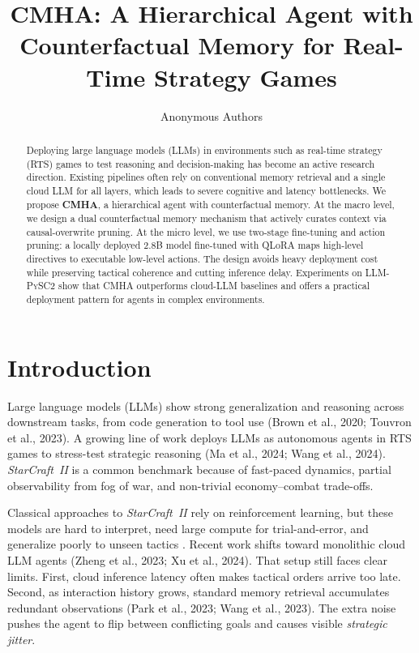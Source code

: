 \documentclass[11pt,a4paper]{article}
\title{CMHA: A Hierarchical Agent with Counterfactual Memory for Real-Time Strategy Games}
\author{Anonymous Authors}
\begin{document}
\maketitle

\begin{abstract}
Deploying large language models (LLMs) in environments such as real-time strategy (RTS) games to test reasoning and decision-making has become an active research direction. Existing pipelines often rely on conventional memory retrieval and a single cloud LLM for all layers, which leads to severe cognitive and latency bottlenecks. We propose \textbf{CMHA}, a hierarchical agent with counterfactual memory. At the macro level, we design a dual counterfactual memory mechanism that actively curates context via causal-overwrite pruning. At the micro level, we use two-stage fine-tuning and action pruning: a locally deployed 2.8B model fine-tuned with QLoRA maps high-level directives to executable low-level actions. The design avoids heavy deployment cost while preserving tactical coherence and cutting inference delay. Experiments on \textsc{LLM-PySC2} show that CMHA outperforms cloud-LLM baselines and offers a practical deployment pattern for agents in complex environments.
\end{abstract}

\section{Introduction}

Large language models (LLMs) show strong generalization and reasoning across downstream tasks, from code generation to tool use (Brown et al., 2020; Touvron et al., 2023). A growing line of work deploys LLMs as autonomous agents in RTS games to stress-test strategic reasoning (Ma et al., 2024; Wang et al., 2024). \textit{StarCraft~II} is a common benchmark because of fast-paced dynamics, partial observability from fog of war, and non-trivial economy--combat trade-offs.

Classical approaches to \textit{StarCraft~II} rely on reinforcement learning, but these models are hard to interpret, need large compute for trial-and-error, and generalize poorly to unseen tactics \citep{vinyals2019}. Recent work shifts toward monolithic cloud LLM agents (Zheng et al., 2023; Xu et al., 2024). That setup still faces clear limits. First, cloud inference latency often makes tactical orders arrive too late. Second, as interaction history grows, standard memory retrieval accumulates redundant observations (Park et al., 2023; Wang et al., 2023). The extra noise pushes the agent to flip between conflicting goals and causes visible \emph{strategic jitter}.
\end{document}
